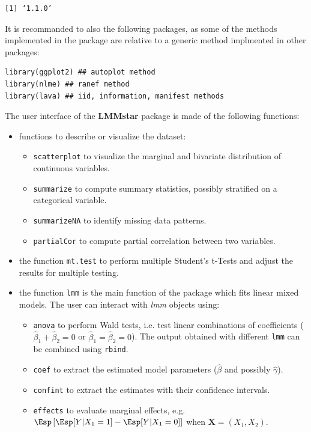 \documentclass[12pt]{article}
\newcommand{\VX}{\boldsymbol{X}}
\begin{document}
\begin{verbatim}
[1] ‘1.1.0’
\end{verbatim}


It is recommanded to also the following packages, as some of the
methods implemented in the package are relative to a generic method
implmented in other packages:
\lstset{language=r,label= ,caption= ,captionpos=b,numbers=none}
\begin{lstlisting}
library(ggplot2) ## autoplot method
library(nlme) ## ranef method
library(lava) ## iid, information, manifest methods
\end{lstlisting}

\clearpage

The user interface of the \textbf{LMMstar} package is made of the following
functions:
\begin{itemize}
\item functions to describe or visualize the dataset: 
\begin{itemize}
\item \texttt{scatterplot} to visualize the marginal and bivariate distribution of continuous variables.
\item \texttt{summarize} to compute summary statistics, possibly stratified on a categorical variable.
\item \texttt{summarizeNA} to identify missing data patterns.
\item \texttt{partialCor} to compute partial correlation between two variables.
\end{itemize}
\item the function \texttt{mt.test} to perform multiple Student's t-Tests and
adjust the results for multiple testing.
\item the function \texttt{lmm} is the main function of the package which fits
linear mixed models. The user can interact with \emph{lmm} objects using:
\begin{itemize}
\item \texttt{anova} to perform Wald tests, i.e. test linear combinations of
coefficients (\(\widehat{\beta}_1+\widehat{\beta}_2=0\) or
\(\widehat{\beta}_1=\widehat{\beta}_2=0\)). The output obtained
with different \texttt{lmm} can be combined using \texttt{rbind}.
\item \texttt{coef} to extract the estimated model parameters (\(\widehat{\beta}\) and possibly \(\widehat{\gamma}\)).
\item \texttt{confint} to extract the estimates with their confidence intervals.
\item \texttt{effects} to evaluate marginal effects, e.g. \(\Esp\left[\Esp[Y|X_1=1]-\Esp[Y|X_1=0]\right]\) when \(\VX=(X_1,X_2)\).

\end{itemize}
\end{itemize}
\end{document}
